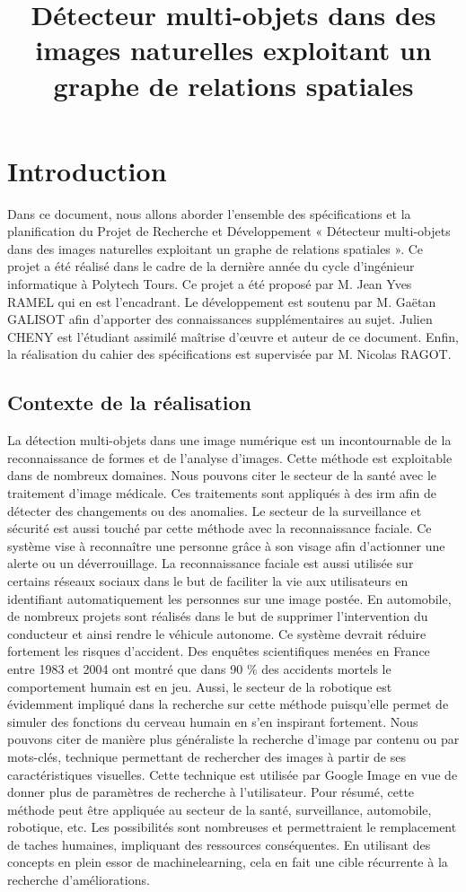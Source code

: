 \documentclass[debug,nodate,hideweeklyreports]{polytech/polytech}
\title{Détecteur multi-objets dans des images naturelles exploitant un graphe de relations spatiales}
\begin{document}
             
\chapter{Introduction}

Dans ce document, nous allons aborder l’ensemble des spécifications et la planification du Projet de Recherche et Développement « Détecteur multi-objets dans des images naturelles exploitant un graphe de relations spatiales ». Ce projet a été réalisé dans le cadre de la dernière année du cycle d’ingénieur informatique à Polytech Tours. 
Ce projet a été proposé par M. Jean Yves RAMEL qui en est l’encadrant. Le développement est soutenu par M. Gaëtan GALISOT afin d’apporter des connaissances supplémentaires au sujet. Julien CHENY est l’étudiant assimilé maîtrise d’œuvre et auteur de ce document. Enfin, la réalisation du cahier des spécifications est supervisée par M. Nicolas RAGOT.

\section{Contexte de la réalisation}

La détection multi-objets dans une image numérique est un incontournable de la reconnaissance de formes et de l’analyse d’images. 
Cette méthode est exploitable dans de nombreux domaines.
Nous pouvons citer le secteur de la santé avec le traitement d’image médicale. Ces traitements sont appliqués à des \gls{irm} afin de détecter des changements ou des anomalies.
Le secteur de la surveillance et sécurité est aussi touché par cette méthode avec la reconnaissance faciale. Ce système vise à reconnaître une personne grâce à son visage afin d’actionner une alerte ou un déverrouillage. La reconnaissance faciale est aussi utilisée sur certains réseaux sociaux dans le but de faciliter la vie aux utilisateurs en identifiant automatiquement les personnes sur une image postée.
En automobile, de nombreux projets sont réalisés dans le but de supprimer l’intervention du conducteur et ainsi rendre le véhicule autonome. Ce système devrait réduire fortement les risques d’accident. Des enquêtes scientifiques menées en France entre 1983 et 2004 ont montré que dans 90 \% des accidents mortels le comportement humain est en jeu.
Aussi, le secteur de la robotique est évidemment impliqué dans la recherche sur cette méthode puisqu’elle permet de simuler des fonctions du cerveau humain en s’en inspirant fortement.
Nous pouvons citer de manière plus généraliste la recherche d’image par contenu ou par mots-clés, technique permettant de rechercher des images à partir de ses caractéristiques visuelles. Cette technique est utilisée par Google Image en vue de donner plus de paramètres de recherche à l’utilisateur.
Pour résumé, cette méthode peut être appliquée au secteur de la santé, surveillance, automobile, robotique, etc. Les possibilités sont nombreuses et permettraient le remplacement de taches humaines, impliquant des ressources conséquentes. 
En utilisant des concepts en plein essor de \gls{machinelearning}, cela en fait une cible récurrente à la recherche d’améliorations.
\end{document}
